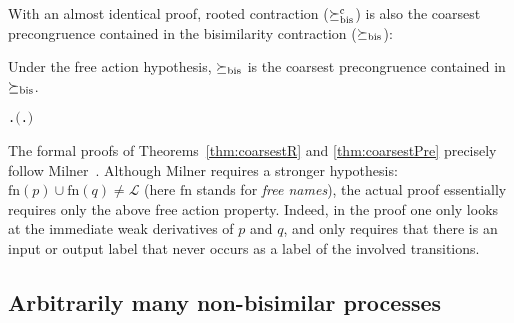 With an almost identical proof, rooted contraction
($\mathrel{\succeq^{\rm{c}}_{\rm{bis}}}$) is also the coarsest
precongruence contained in the bisimilarity contraction ($\mathrel{\succeq_{\rm{bis}}}$):
\begin{theorem}
  \label{thm:coarsestPre}
  Under the free action hypothesis, $\mathrel{\succeq_{\rm{bis}}}$ is the coarsest precongruence contained in $\mathrel{\succeq_{\rm{bis}}}$.
\begin{alltt}
\HOLTokenTurnstile{} \HOLSymConst{\HOLTokenForall{}} .   \HOLSymConst{\HOLTokenConj{}}   \HOLSymConst{\HOLTokenImp{}} \ensuremath{(}\HOLSymConst{\HOLTokenForall{}}.  \HOLSymConst{\ensuremath{+}}  \HOLSymConst{\HOLTokenContracts{}}  \HOLSymConst{\ensuremath{+}} \ensuremath{)} \HOLSymConst{\HOLTokenImp{}}  \HOLSymConst{\HOLTokenObsContracts} 
\end{alltt}
\end{theorem}

The formal proofs of Theorems~\ref{thm:coarsestR} and %
\ref{thm:coarsestPre} precisely follow Milner~\citep[p.~153--154]{Mil89}.
Although Milner requires a stronger hypothesis: $\mathrm{fn}(p) \cup
\mathrm{fn}(q) \neq \mathscr{L}$ (here $\mathrm{fn}$ stands for \emph{free
  names}), the actual proof essentially requires only the above
free action property.
Indeed, in the proof one only looks at the immediate weak
derivatives of $p$ and $q$, and only requires that there is an input
or output label that never occurs as a label of the involved transitions.

\subsection{Arbitrarily many non-bisimilar processes}
\label{ss:arbitrarily}

